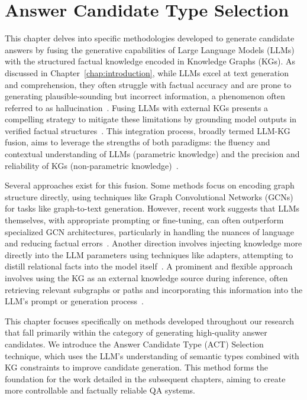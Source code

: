 \chapter{Answer Candidate Type Selection}
\label{chap:act_selection}


This chapter delves into specific methodologies developed to generate candidate answers by fusing the generative capabilities of Large Language Models (LLMs) with the structured factual knowledge encoded in Knowledge Graphs (KGs). As discussed in Chapter~\ref{chap:introduction}, while LLMs excel at text generation and comprehension, they often struggle with factual accuracy and are prone to generating plausible-sounding but incorrect information, a phenomenon often referred to as hallucination~\cite{lin-etal-2022-truthfulqa, DBLP:conf/emnlp/RobertsRS20}. Fusing LLMs with external KGs presents a compelling strategy to mitigate these limitations by grounding model outputs in verified factual structures~\cite{DBLP:journals/tkde/PanLWCWW24}. This integration process, broadly termed LLM-KG fusion, aims to leverage the strengths of both paradigms: the fluency and contextual understanding of LLMs (parametric knowledge) and the precision and reliability of KGs (non-parametric knowledge)~\cite{DBLP:conf/acl/MallenAZDKH23}.

Several approaches exist for this fusion. Some methods focus on encoding graph structure directly, using techniques like Graph Convolutional Networks (GCNs) for tasks like graph-to-text generation. However, recent work suggests that LLMs themselves, with appropriate prompting or fine-tuning, can often outperform specialized GCN architectures, particularly in handling the nuances of language and reducing factual errors~\cite{iarosh-etal-2025-reducing, DBLP:conf/ijcai/0001LW0S0Y24}. Another direction involves injecting knowledge more directly into the LLM parameters using techniques like adapters, attempting to distill relational facts into the model itself~\cite{DBLP:journals/corr/abs-2002-01808}. A prominent and flexible approach involves using the KG as an external knowledge source during inference, often retrieving relevant subgraphs or paths and incorporating this information into the LLM's prompt or generation process~\cite{DBLP:conf/emnlp/KnowledgeAugmented}.

This chapter focuses specifically on methods developed throughout our research that fall primarily within the category of generating high-quality answer candidates. We introduce the Answer Candidate Type (ACT) Selection~\cite{DBLP:journals/corr/abs-2310-07008} technique, which uses the LLM's understanding of semantic types combined with KG constraints to improve candidate generation. This method forms the foundation for the work detailed in the subsequent chapters, aiming to create more controllable and factually reliable QA systems.


